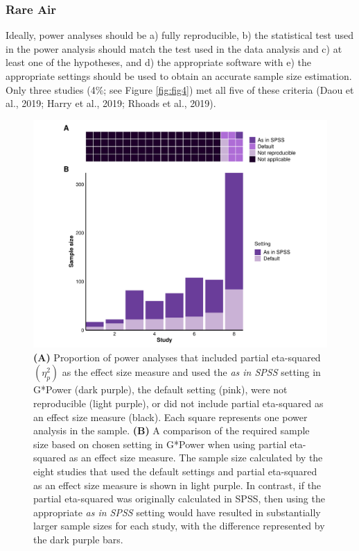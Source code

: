 \documentclass[
  doc, donotrepeattitle,floatsintext]{apa7}
\begin{document}
\hypertarget{rare-air}{%
\subsubsection{Rare Air}\label{rare-air}}

Ideally, power analyses should be a) fully reproducible, b) the statistical test used in the power analysis should match the test used in the data analysis and c) at least one of the hypotheses, and d) the appropriate software with e) the appropriate settings should be used to obtain an accurate sample size estimation. Only three studies (4\%; see Figure \ref{fig:fig4}) met all five of these criteria (Daou et al., 2019; Harry et al., 2019; Rhoads et al., 2019).

\clearpage

\begin{figure}

{\centering \includegraphics{../../figs/fig3} 

}

\caption{\normalfont
\textbf{(A)} Proportion of power analyses that included partial eta-squared \((\eta_{p}^2)\) as the effect size measure and used the \emph{as in SPSS} setting in G*Power (dark purple), the default setting (pink), were not reproducible (light purple), or did not include partial eta-squared as an effect size measure (black). Each square represents one power analysis in the sample. \textbf{(B)} A comparison of the required sample size based on chosen setting in G*Power when using partial eta-squared as an effect size measure. The sample size calculated by the eight studies that used the default settings and partial eta-squared as an effect size measure is shown in light purple. In contrast, if the partial eta-squared was originally calculated in SPSS, then using the appropriate \emph{as in SPSS} setting would have resulted in substantially larger sample sizes for each study, with the difference represented by the dark purple bars.}\label{fig:fig3}
\end{figure}
\end{document}
